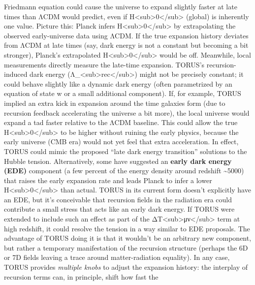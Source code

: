 \documentclass[
]{article}
\begin{document}
\begin{enumerate}
  Friedmann equation could cause the universe to expand slightly faster
  at late times than ΛCDM would predict, even if
  H\textless sub\textgreater0\textless/sub\textgreater{} (global) is
  inherently one value. Picture this: Planck infers
  H\textless sub\textgreater0\textless/sub\textgreater{} by
  extrapolating the observed early-universe data using ΛCDM. If the true
  expansion history deviates from ΛCDM at late times (say, dark energy
  is not a constant but becoming a bit stronger), Planck's extrapolated
  H\textless sub\textgreater0\textless/sub\textgreater{} would be off.
  Meanwhile, local measurements directly measure the late-time
  expansion. TORUS's recursion-induced dark energy
  (Λ\_\textless sub\textgreater rec\textless/sub\textgreater) might not
  be precisely constant; it could behave slightly like a dynamic dark
  energy (often parametrized by an equation of state w or a small
  additional component). If, for example, TORUS implied an extra kick in
  expansion around the time galaxies form (due to recursion feedback
  accelerating the universe a bit more), the local universe would expand
  a tad faster relative to the ΛCDM baseline. This could allow the true
  H\textless sub\textgreater0\textless/sub\textgreater{} to be higher
  without ruining the early physics, because the early universe (CMB
  era) would not yet feel that extra acceleration. In effect, TORUS
  could mimic the proposed ``late dark energy transition'' solutions to
  the Hubble tension. Alternatively, some have suggested an
  \textbf{early dark energy (EDE)} component (a few percent of the
  energy density around redshift \textasciitilde5000) that raises the
  early expansion rate and leads Planck to infer a lower
  H\textless sub\textgreater0\textless/sub\textgreater{} than actual.
  TORUS in its current form doesn't explicitly have an EDE, but it's
  conceivable that recursion fields in the radiation era could
  contribute a small stress that acts like an early dark energy. If
  TORUS were extended to include such an effect as part of the
  ΔT\textless sub\textgreater μν\textless/sub\textgreater{} term at high
  redshift, it could resolve the tension in a way similar to EDE
  proposals\hspace{0pt}. The advantage of TORUS doing it is that it
  wouldn't be an arbitrary new component, but rather a temporary
  manifestation of the recursion structure (perhaps the 6D or 7D fields
  leaving a trace around matter-radiation equality). In any case, TORUS
  provides \emph{multiple knobs} to adjust the expansion history: the
  interplay of recursion terms can, in principle, shift how fast the

\end{enumerate}
\end{document}
